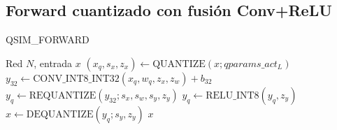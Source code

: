         \subsection*{Forward cuantizado con fusión Conv+ReLU}
        \begin{algorithm}[H]
        \caption{QSIM\_FORWARD}
        \begin{algorithmic}[1]
        \Require Red $N$, entrada $x$
            \State $(x_q,s_x,z_x) \gets \text{QUANTIZE}(x; qparams\_act_L)$
            \State $y_{32} \gets \text{CONV\_INT8\_INT32}(x_q, w_q, z_x, z_w) + b_{32}$
            \State $y_q \gets \text{REQUANTIZE}(y_{32}; s_x, s_w, s_y, z_y)$
             $y_q \gets \text{RELU\_INT8}(y_q, z_y)$ \EndIf
            \State $x \gets \text{DEQUANTIZE}(y_q; s_y, z_y)$
        \EndFor
        \State \Return $x$
        \end{algorithmic}
        \end{algorithm}
